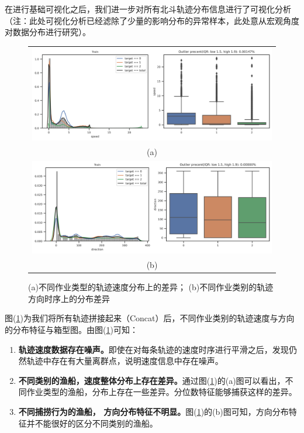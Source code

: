 \documentclass[UTF8, 12pt]{ctexart}
\begin{document}
	在进行基础可视化之后，我们进一步对所有北斗轨迹分布信息进行了可视化分析（注：此处可视化分析已经滤除了少量的影响分布的异常样本，此处意从宏观角度对数据分布进行研究）。
	\begin{figure}[H]
		\centering
		\begin{tabular}{c}
			\includegraphics[width=0.65\linewidth]{..//plots//feature_speed_distribution.png} \\
			(a) \\
			\includegraphics[width=0.65\linewidth]{..//plots//feature_direction_distribution.png} \\
			(b)
		\end{tabular}
		\caption{(a)不同作业类型的轨迹速度分布上的差异； (b)不同作业类别的轨迹方向时序上的分布差异}
		\label{sec_1_fig_3}
		\vspace{-0.2cm}
	\end{figure}
	图(\ref{sec_1_fig_3})为我们将所有轨迹拼接起来（Concat）后，不同作业类别的轨迹速度与方向的分布特征与箱型图。由图(\ref{sec_1_fig_3})可知：
	\begin{enumerate}
		\item \textbf{轨迹速度数据存在噪声。}即使在对每条轨迹的速度时序进行平滑之后，发现仍然轨迹中存在有大量离群点，说明速度信息中存在噪声。
		\item \textbf{不同类别的渔船，速度整体分布上存在差异。}通过图(\ref{sec_1_fig_3})的(a)图可以看出，不同作业类型的渔船，分布上存在一些差异。分位数特征能够捕获这样的差异。
		\item \textbf{不同捕捞行为的渔船， 方向分布特征不明显。}图(\ref{sec_1_fig_3})的(b)图可知，方向分布特征并不能很好的区分不同类别的渔船。
	\end{enumerate}
\end{document}
